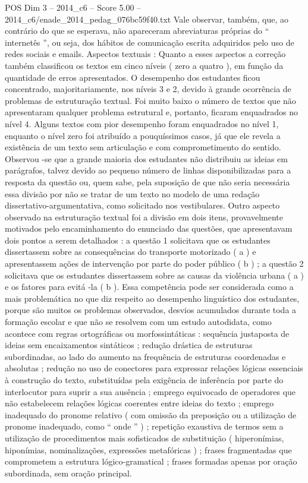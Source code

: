 \begin{textsample}{POS Dim 3 – 2014\_c6 – Score 5.00 – 2014\_c6/enade\_2014\_pedag\_076bc59f40.txt}
Vale observar, também, que, ao contrário do que se esperava, não apareceram abreviaturas próprias do “ internetês ”, ou seja, dos hábitos de comunicação escrita adquiridos pelo uso de redes sociais e emails.
Aspectos textuais : Quanto a esses aspectos a correção também classificou os textos em cinco níveis ( zero a quatro ), em função da quantidade de erros apresentados.
O desempenho dos estudantes ficou concentrado, majoritariamente, nos níveis 3 e 2, devido à grande ocorrência de problemas de estruturação textual.
Foi muito baixo o número de textos que não apresentaram qualquer problema estrutural e, portanto, ficaram enquadrados no nível 4.
Alguns textos com pior desempenho foram enquadrados no nível 1, enquanto o nível zero foi atribuído a pouquíssimos casos, já que ele revela a existência de um texto sem articulação e com comprometimento do sentido.
Observou -se que a grande maioria dos estudantes não distribuiu as ideias em parágrafos, talvez devido ao pequeno número de linhas disponibilizadas para a resposta da questão ou, quem sabe, pela suposição de que não seria necessária essa divisão por não se tratar de um texto no modelo de uma redação dissertativo-argumentativa, como solicitado nos vestibulares.
Outro aspecto observado na estruturação textual foi a divisão em dois itens, provavelmente motivados pelo encaminhamento do enunciado das questões, que apresentavam dois pontos a serem detalhados : a questão 1 solicitava que os estudantes dissertassem sobre as consequências do transporte motorizado ( a ) e apresentassem ações de intervenção por parte do poder público ( b ) ; a questão 2 solicitava que os estudantes dissertassem sobre as causas da violência urbana ( a ) e os fatores para evitá -la ( b ).
Essa competência pode ser considerada como a mais problemática no que diz respeito ao desempenho linguístico dos estudantes, porque são muitos os problemas observados, desvios acumulados durante toda a formação escolar e que não se resolvem com um estudo autodidata, como acontece com regras ortográficas ou morfossintáticas : sequência justaposta de ideias sem encaixamentos sintáticos ; redução drástica de estruturas subordinadas, ao lado do aumento na frequência de estruturas coordenadas e absolutas ; redução no uso de conectores para expressar relações lógicas essenciais à construção do texto, substituídas pela exigência de inferência por parte do interlocutor para suprir a sua ausência ; emprego equivocado de operadores que não estabelecem relações lógicas coerentes entre ideias do texto ; emprego inadequado do pronome relativo ( com omissão da preposição ou a utilização de pronome inadequado, como “ onde ” ) ; repetição exaustiva de termos sem a utilização de procedimentos mais sofisticados de substituição ( hiperonímias, hiponímias, nominalizações, expressões metafóricas ) ; frases fragmentadas que comprometem a estrutura lógico-gramatical ; frases formadas apenas por oração subordinada, sem oração principal.

\end{textsample}
